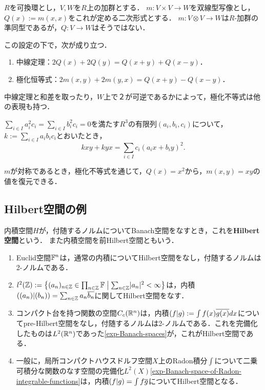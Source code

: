 \documentclass[uplatex,dvipdfmx]{jsreport}
\begin{document}
$R$を可換環とし，$V,W$を$R$上の加群とする．
$m:V\times V\to W$を双線型写像とし，$Q(x):=m(x,x)$をこれが定める二次形式とする．
$m:V\otimes V\to W$は$R$-加群の準同型であるが，$Q:V\to W$はそうではない．

この設定の下で，次が成り立つ．
\begin{proposition}\mbox{}
    \begin{enumerate}
        \item 中線定理：$2Q(x)+2Q(y)=Q(x+y)+Q(x-y)$．
        \item 極化恒等式：$2m(x,y)+2m(y,x)=Q(x+y)-Q(x-y)$．
    \end{enumerate}
    中線定理と和差を取ったり，$W$上で２が可逆であるかによって，極化不等式は他の表現も持つ．
\end{proposition}

\begin{proposition}[極化不等式の一般形]
    $\sum_{i\in I}a_i^2c_i=\sum_{i\in I}b_i^2c_i=0$を満たす$R^3$の有限列$(a_i,b_i,c_i)$について，$k:=\sum_{i\in I}a_ib_ic_i$とおいたとき，
    \[kxy+kyx=\sum_{i\in I}c_i(a_ix+b_iy)^2.\]
\end{proposition}

$m$が対称であるとき，極化不等式を通じて，$Q(x)=x^2$から，$m(x,y)=xy$の値を復元できる．

\subsection{Hilbert空間の例}

\begin{definition}
    内積空間$H$が，付随するノルムについてBanach空間をなすとき，これを\textbf{Hilbert空間}という．
    また内積空間を前Hilbert空間ともいう．
\end{definition}

\begin{example}\mbox{}
    \begin{enumerate}
        \item Euclid空間$\mathbb{F}^n$は，通常の内積についてHilbert空間をなし，付随するノルムは2-ノルムである．
        \item $l^2(\mathbb{Z}):=\left\{(a_n)_{n\in\mathbb{Z}}\in\prod_{n\in\mathbb{Z}}\mathbb{F}\;\middle|\;\sum_{n\in\mathbb{Z}}\lvert a_n\rvert^2<\infty\right\}$は，内積$((a_n)|(b_n))=\sum_{n\in\mathbb{Z}}a_n\overline{b_n}$に関してHilbert空間をなす．
        \item コンパクト台を持つ関数の空間$C_c(\mathbb{R}^n)$は，内積$(f|g):=\int f(x)\overline{g(x)}dx$についてpre-Hilbert空間をなし，付随するノルムは2-ノルムである．これを完備化したものは$L^2(\mathbb{R}^n)$であった\ref{exp-Banach-spaces}が，これがHilbert空間である．
        \item 一般に，局所コンパクトハウスドルフ空間$X$上のRadon積分$\int$について二乗可積分な関数のなす空間の完備化$L^2(X)$\ref{exp-Banach-space-of-Radon-integrable-functions}は，内積$(f|g)=\int f\overline{g}$についてHilbert空間となる．
    \end{enumerate}
\end{example}
\end{document}
